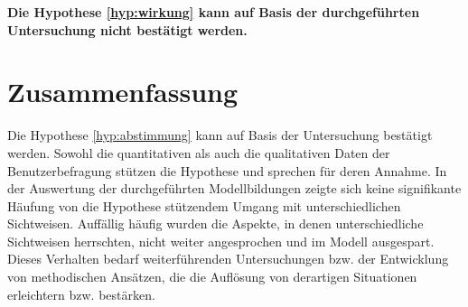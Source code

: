 \textbf{Die Hypothese \ref{hyp:wirkung} kann auf Basis der durchgeführten Untersuchung nicht bestätigt werden.}


\section{Zusammenfassung} %
\label{sec:a_zusammenfassung}

Die Hypothese \ref{hyp:abstimmung} kann auf Basis der Untersuchung bestätigt werden. Sowohl die quantitativen als auch die qualitativen Daten der Benutzerbefragung stützen die Hypothese und sprechen für deren Annahme. In der Auswertung der durchgeführten Modellbildungen zeigte sich keine signifikante Häufung von die Hypothese stützendem Umgang mit unterschiedlichen Sichtweisen. Auffällig häufig wurden die Aspekte, in denen unterschiedliche Sichtweisen herrschten, nicht weiter angesprochen und im Modell ausgespart. Dieses Verhalten bedarf weiterführenden Untersuchungen bzw. der Entwicklung von methodischen Ansätzen, die die Auflösung von derartigen Situationen erleichtern bzw. bestärken.


